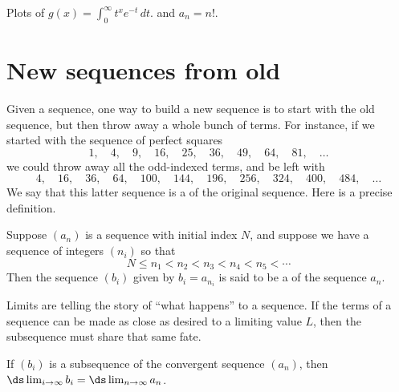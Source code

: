 \begin{marginfigure}[0in]
\caption{Plots of $g(x) = \int_0^\infty t^{x} e^{-t} \, dt.$ and $a_n = n!$.}
\label{fig:gamma-function}
\end{marginfigure}

\section{New sequences from old}
\label{section:new-sequences-from-old}

Given a sequence, one way to build a new sequence is to start with the
old sequence, but then throw away a whole bunch of terms.  For
instance, if we started with the sequence of perfect squares
$$
1,\quad 4,\quad 9,\quad 16,\quad 25,\quad 36,\quad 49,\quad 64,\quad 81,\quad\ldots
$$
we could throw away all the odd-indexed terms, and be left with
$$
4,\quad 16,\quad 36,\quad 64,\quad 100,\quad 144,\quad 196,\quad 256,\quad 324,\quad 400,\quad 484,\quad\ldots
$$
We say that this latter sequence is a
of the original sequence.  Here is a precise definition.

\begin{definition}
  Suppose $(a_n)$ is a sequence with initial index $N$, and suppose we have a sequence of integers $(n_i)$ so that
  $$
  N \leq n_1 < n_2 < n_3 < n_4 < n_5 < \cdots 
  $$
  Then the sequence $(b_i)$ given by $b_i = a_{n_i}$ is said to be a 
  of the sequence $a_n$.
\end{definition}

Limits are telling the story of ``what happens'' to a sequence.  If
the terms of a sequence can be made as close as desired to a limiting
value $L$, then the subsequence must share that same fate.

\begin{theorem}
  \label{theorem:subsequence-same-limit}
  If $(b_i)$ is a subsequence of the convergent sequence $(a_n)$, then
  $\ds\lim_{i \to \infty} b_i = \ds\lim_{n \to \infty} a_n$.
\end{theorem}

